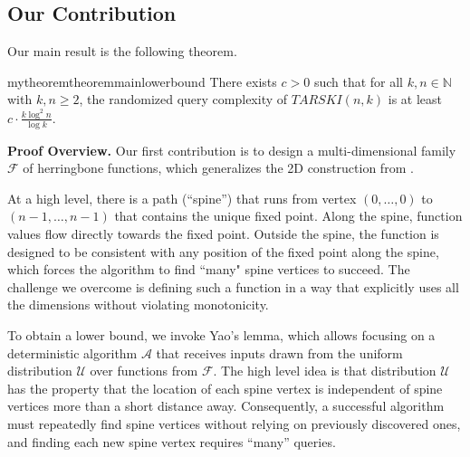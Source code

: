 \documentclass[11pt]{article}
\begin{document}
\subsection{Our Contribution}

Our main result is the following theorem.

\begin{restatable}{mytheorem}{theoremmainlowerbound}
\label{thm:lb_k_log_squared_n}
There exists $c > 0$ such that for all $k,n \in \mathbb{N}$ with $k, n \geq 2$, the randomized query complexity of $TARSKI(n,k)$ is at least $c \cdot  \frac{k \log^2{n}}{\log{k}}$.
\end{restatable}



\vspace{1mm}
\noindent \textbf{Proof Overview.} 
Our first contribution is to design a  multi-dimensional family $\mathcal{F}$ of herringbone functions, which generalizes the 2D construction from \cite{etessami2019tarski}. 

At a high level, 
there is a path (``spine'') that runs from vertex $(0, \ldots, 0)$ to $(n-1, \ldots, n-1)$ that contains the unique fixed point. Along the spine, function values flow directly towards the fixed point. Outside the spine, the function is designed to be consistent with any position of the fixed point along the spine, which forces the algorithm to find ``many" spine vertices to succeed. The challenge we overcome is defining such a function in a way that explicitly uses all the dimensions without violating monotonicity.

To obtain a lower bound, we invoke Yao's lemma, which allows focusing on a deterministic algorithm $\mathcal{A}$ that receives inputs drawn from the uniform distribution $\mathcal{U}$ over functions from $\mathcal{F}$. The high level idea  is that  distribution $\mathcal{U}$ has the property that the location of each spine vertex is independent of spine vertices more than a short distance away. 
Consequently, a successful algorithm must repeatedly find spine vertices without relying on previously discovered ones, and finding each new spine vertex requires ``many'' queries.
\end{document}
